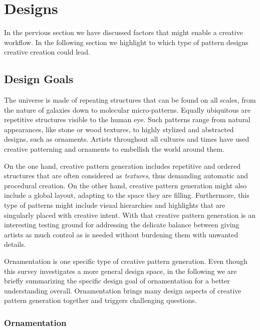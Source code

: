 
\section{Designs}

In the pervious section we have discussed factors that might enable a creative workflow. In the following section we highlight to which type of pattern designs creative creation could lead.

\subsection{Design Goals}
\label{subsec:design_goals}

The universe is made of repeating structures that can be found on all scales, from the nature of galaxies down to molecular micro-patterns. Equally ubiquitous are repetitive structures visible to the human eye. Such patterns range from natural appearances, like stone or wood textures, to highly stylized and abstracted designs, such as ornaments. Artists throughout all cultures and times have used creative patterning and ornaments to embellish the world around them. 

On the one hand, creative pattern generation includes repetitive and ordered structures that are often considered as \textit{textures}, thus demanding automatic and procedural creation. On the other hand, creative pattern generation might also include a global layout, adapting to the space they are filling. Furthermore, this type of patterns might include visual hierarchies and highlights that are singularly placed with creative intent. With that creative pattern generation is an interesting testing ground for addressing the delicate balance between giving artists as much control as is needed without burdening them with unwanted details.

Ornamentation is one specific type of creative pattern generation. Even though this survey investigates a more general design space, in the following we are briefly summarizing the specific design goal of ornamentation for a better understanding overall. Ornamentation brings many design aspects of creative pattern generation together and triggers challenging questions. 

\subsubsection{Ornamentation}
\label{subsubsec:ornamentation}

